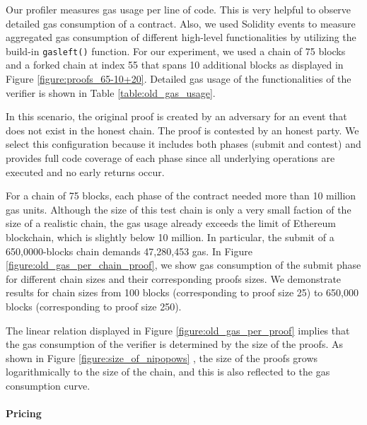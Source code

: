 Our profiler measures gas usage per line of code. This is very helpful to
observe detailed gas consumption of a contract. Also, we used Solidity events
to measure aggregated gas consumption of different high-level functionalities
by utilizing the build-in \texttt{gasleft()} function. For our experiment, we
used a chain of 75 blocks and a forked chain at index 55 that spans 10
additional blocks as displayed in Figure \ref{figure:proofs_65-10+20}. Detailed
gas usage of the functionalities of the verifier is shown in Table
\ref{table:old_gas_usage}.



In this scenario, the original proof is created by an adversary for an event
that does not exist in the honest chain. The proof is contested by an honest
party. We select this configuration because it includes both phases
(submit and contest) and provides full code coverage of each phase since all
underlying operations are executed and no early returns occur.

For a chain of 75 blocks, each phase of the contract needed more than 10
million gas units. Although the size of this test chain is only a very small
faction of the size of a realistic chain, the gas usage already exceeds the
limit of Ethereum blockchain, which is slightly below 10 million. In
particular, the submit of a 650,0000-blocks chain demands 47,280,453 gas. In
Figure \ref{figure:old_gas_per_chain_proof}, we show gas consumption of the submit
phase for different chain sizes and their corresponding proofs sizes. We
demonstrate results for chain sizes from 100 blocks (corresponding to proof size
25) to 650,000 blocks (corresponding to proof size 250).

The linear relation displayed in Figure \ref{figure:old_gas_per_proof} implies
that the gas consumption of the verifier is determined by the size of the
proofs. As shown in Figure \ref{figure:size_of_nipopows} , the size of the
proofs grows logarithmically to the size of the chain, and this is also
reflected to the gas consumption curve.





\paragraph{Pricing}

